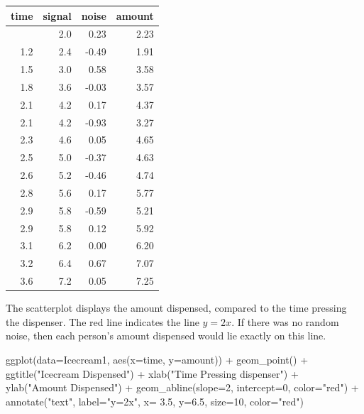 \documentclass[
  letterpaper,
  DIV=11,
  numbers=noendperiod]{scrreprt}
\newenvironment{Shaded}{\begin{snugshade}}{\end{snugshade}}
\newcommand{\AttributeTok}[1]{\textcolor[rgb]{0.40,0.45,0.13}{#1}}
\newcommand{\DecValTok}[1]{\textcolor[rgb]{0.68,0.00,0.00}{#1}}
\newcommand{\FloatTok}[1]{\textcolor[rgb]{0.68,0.00,0.00}{#1}}
\newcommand{\FunctionTok}[1]{\textcolor[rgb]{0.28,0.35,0.67}{#1}}
\newcommand{\NormalTok}[1]{\textcolor[rgb]{0.00,0.23,0.31}{#1}}
\newcommand{\SpecialCharTok}[1]{\textcolor[rgb]{0.37,0.37,0.37}{#1}}
\newcommand{\StringTok}[1]{\textcolor[rgb]{0.13,0.47,0.30}{#1}}
\begin{document}
\begin{longtable}[]{@{}rrrr@{}}
\toprule\noalign{}
time & signal & noise & amount \\
\midrule\noalign{}
\endhead
\bottomrule\noalign{}
\endlastfoot
1.0 & 2.0 & 0.23 & 2.23 \\
1.2 & 2.4 & -0.49 & 1.91 \\
1.5 & 3.0 & 0.58 & 3.58 \\
1.8 & 3.6 & -0.03 & 3.57 \\
2.1 & 4.2 & 0.17 & 4.37 \\
2.1 & 4.2 & -0.93 & 3.27 \\
2.3 & 4.6 & 0.05 & 4.65 \\
2.5 & 5.0 & -0.37 & 4.63 \\
2.6 & 5.2 & -0.46 & 4.74 \\
2.8 & 5.6 & 0.17 & 5.77 \\
2.9 & 5.8 & -0.59 & 5.21 \\
2.9 & 5.8 & 0.12 & 5.92 \\
3.1 & 6.2 & 0.00 & 6.20 \\
3.2 & 6.4 & 0.67 & 7.07 \\
3.6 & 7.2 & 0.05 & 7.25 \\
\end{longtable}

The scatterplot displays the amount dispensed, compared to the time
pressing the dispenser. The red line indicates the line \(y=2x\). If
there was no random noise, then each person's amount dispensed would lie
exactly on this line.

\begin{Shaded}
\begin{Highlighting}[]
\FunctionTok{ggplot}\NormalTok{(}\AttributeTok{data=}\NormalTok{Icecream1, }\FunctionTok{aes}\NormalTok{(}\AttributeTok{x=}\NormalTok{time, }\AttributeTok{y=}\NormalTok{amount)) }\SpecialCharTok{+} \FunctionTok{geom\_point}\NormalTok{() }\SpecialCharTok{+} \FunctionTok{ggtitle}\NormalTok{(}\StringTok{"Icecream Dispensed"}\NormalTok{) }\SpecialCharTok{+} \FunctionTok{xlab}\NormalTok{(}\StringTok{"Time Pressing dispenser"}\NormalTok{) }\SpecialCharTok{+} \FunctionTok{ylab}\NormalTok{(}\StringTok{"Amount Dispensed"}\NormalTok{) }\SpecialCharTok{+} \FunctionTok{geom\_abline}\NormalTok{(}\AttributeTok{slope=}\DecValTok{2}\NormalTok{, }\AttributeTok{intercept=}\DecValTok{0}\NormalTok{, }\AttributeTok{color=}\StringTok{"red"}\NormalTok{) }\SpecialCharTok{+} 
  \FunctionTok{annotate}\NormalTok{(}\StringTok{"text"}\NormalTok{, }\AttributeTok{label=}\StringTok{"y=2x"}\NormalTok{, }\AttributeTok{x=} \FloatTok{3.5}\NormalTok{, }\AttributeTok{y=}\FloatTok{6.5}\NormalTok{, }\AttributeTok{size=}\DecValTok{10}\NormalTok{, }\AttributeTok{color=}\StringTok{"red"}\NormalTok{)}
\end{Highlighting}
\end{Shaded}
\end{document}
